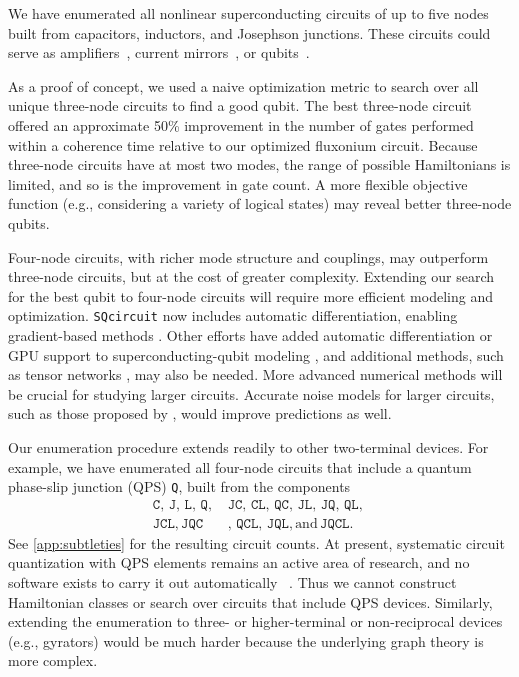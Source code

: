 We have enumerated all nonlinear superconducting circuits of up to five nodes built from capacitors, inductors, and Josephson junctions. These circuits could serve as amplifiers~\cite{blaisCircuitQuantumElectrodynamics2021a}, current mirrors~\cite{kitaev_protected_2006, weiss_spectrum_2019}, or qubits~\cite{blaisCircuitQuantumElectrodynamics2021a}. 



As a proof of concept, we used a naive optimization metric to search over all unique three-node circuits to find a good qubit. The best three-node circuit offered an approximate 50\% improvement in the number of gates performed within a coherence time relative to our optimized fluxonium circuit. Because three-node circuits have at most two modes, the range of possible Hamiltonians is limited, and so is the improvement in gate count. A more flexible objective function (e.g., considering a variety of logical states) may reveal better three-node qubits.



Four-node circuits, with richer mode structure and couplings, may outperform three-node circuits, but at the cost of greater complexity. Extending our search for the best qubit to four-node circuits will require more efficient modeling and optimization. \verb|SQcircuit| now includes automatic differentiation, enabling gradient-based methods \cite{rajabzadehGeneralFrameworkGradientBased2024}. Other efforts have added automatic differentiation or GPU support to superconducting-qubit modeling \cite{guilmin2024dynamiqs, XantheComm}, and additional methods, such as tensor networks \cite{di_paolo_efficient_2021}, may also be needed. More advanced numerical methods will be crucial for studying larger circuits. Accurate noise models for larger circuits, such as those proposed by \citet{dravid2026}, would improve predictions as well.


Our enumeration procedure extends readily to other two-terminal devices. For example, we have enumerated all four-node circuits that include a quantum phase-slip junction (QPS) \verb|Q|, built from the components
\begin{align*}
\texttt{C},\, \texttt{J},\, \texttt{L},\, \texttt{Q},\, &\texttt{JC},\, \texttt{CL},\, \texttt{QC},\, \texttt{JL},\,\texttt{JQ},\, \texttt{QL},\, \\ 
\texttt{JCL},\, \texttt{JQC}&, \, \texttt{QCL}, \, \texttt{JQL}, \textrm{and}\, \texttt{JQCL}.
\end{align*}
See \cref{app:subtleties} for the resulting circuit counts. At present, systematic circuit quantization with QPS elements remains an active area of research, and no software exists to carry it out automatically 
~\cite{osborne_symplectic_2023, parra-rodriguez2023}. Thus we cannot construct Hamiltonian classes or search over circuits that include QPS devices. Similarly, extending the enumeration to three- or higher-terminal or non-reciprocal devices (e.g., gyrators) would be much harder because the underlying graph theory is more complex.


